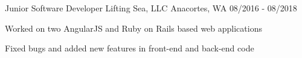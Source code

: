 \begin{cventries}
  \cventry
    {Junior Software Developer} %
    {Lifting Sea, LLC} %
    {Anacortes, WA} %
    {08/2016 - 08/2018} %
    {
      \begin{cvitems}
        \item {Worked on two AngularJS and Ruby on Rails based web applications}
        \item {Fixed bugs and added new features in front-end and back-end code}
      \end{cvitems}
    }
\end{cventries}
